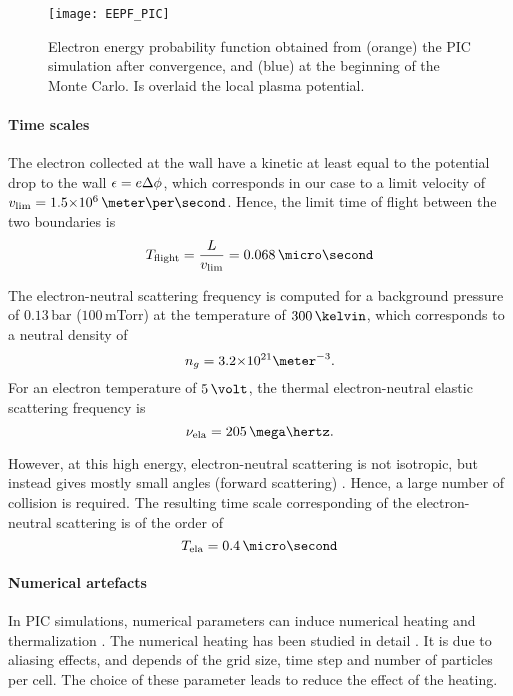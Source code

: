 \begin{figure}[hbtp]
  \centering
  \texttt{[image: EEPF\_PIC]}
  \caption{Electron energy probability function obtained from (orange) the PIC simulation after convergence, and (blue) at the beginning of the Monte Carlo. Is overlaid the local plasma potential.}
  \label{fig-EEPF_start_end}
\end{figure}

\paragraph{Time scales \\}
The electron collected at the wall have a kinetic at least equal to the potential drop to the wall $\epsilon = e \Delta \phi$, which corresponds in our case to a limit velocity of $v_{\rm lim} = \sn{1.5}{6} \,\meter\per\second$.
Hence, the limit time of flight between the two boundaries is
\[ T_{\rm flight} = \frac{L}{v_{\rm lim}} = 0.068 \,\micro\second  \]

\vspace{1em}
The electron-neutral scattering frequency is computed for a background pressure of $0.13$\,bar (${100}$\,mTorr) at the temperature of $300\,\kelvin$, which corresponds to a neutral density of $${n_g = \sn{3.2}{21} \meter^{-3}}.$$
For an electron temperature of $5\,\volt$, the thermal electron-neutral elastic scattering frequency is 
\[ \nu_{\rm ela} = 205 \,\mega\hertz.  \] 

However, at this high energy, electron-neutral scattering is not isotropic, but instead gives mostly small angles (forward scattering) \citep{vahedi1995}.
Hence, a large number of collision is required.
The resulting time scale corresponding of the electron-neutral scattering is of the order of 
\[ T_{\rm ela} = 0.4 \,\micro\second  \]

\paragraph{Numerical artefacts \\}
In PIC simulations, numerical parameters can induce numerical heating and thermalization \citep{lai2014}.
The numerical heating has been studied in detail \citep{birdsall1991}.
It is due to aliasing effects, and depends of the grid size, time step and number of particles per cell.
The choice of these parameter leads to reduce the effect of the heating.

